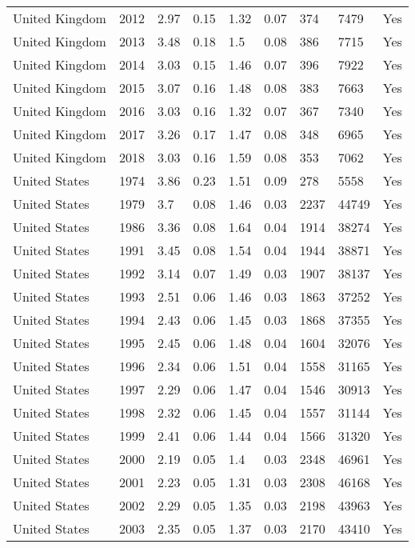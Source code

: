 \begin{tabular}{lllllllll}
United Kingdom & 2012 & 2.97 & 0.15 & 1.32 & 0.07 & 374 & 7479 & Yes \\ 
United Kingdom & 2013 & 3.48 & 0.18 & 1.5 & 0.08 & 386 & 7715 & Yes \\ 
United Kingdom & 2014 & 3.03 & 0.15 & 1.46 & 0.07 & 396 & 7922 & Yes \\ 
United Kingdom & 2015 & 3.07 & 0.16 & 1.48 & 0.08 & 383 & 7663 & Yes \\ 
United Kingdom & 2016 & 3.03 & 0.16 & 1.32 & 0.07 & 367 & 7340 & Yes \\ 
United Kingdom & 2017 & 3.26 & 0.17 & 1.47 & 0.08 & 348 & 6965 & Yes \\ 
United Kingdom & 2018 & 3.03 & 0.16 & 1.59 & 0.08 & 353 & 7062 & Yes \\ 
United States & 1974 & 3.86 & 0.23 & 1.51 & 0.09 & 278 & 5558 & Yes \\ 
United States & 1979 & 3.7 & 0.08 & 1.46 & 0.03 & 2237 & 44749 & Yes \\ 
United States & 1986 & 3.36 & 0.08 & 1.64 & 0.04 & 1914 & 38274 & Yes \\ 
United States & 1991 & 3.45 & 0.08 & 1.54 & 0.04 & 1944 & 38871 & Yes \\ 
United States & 1992 & 3.14 & 0.07 & 1.49 & 0.03 & 1907 & 38137 & Yes \\ 
United States & 1993 & 2.51 & 0.06 & 1.46 & 0.03 & 1863 & 37252 & Yes \\ 
United States & 1994 & 2.43 & 0.06 & 1.45 & 0.03 & 1868 & 37355 & Yes \\ 
United States & 1995 & 2.45 & 0.06 & 1.48 & 0.04 & 1604 & 32076 & Yes \\ 
United States & 1996 & 2.34 & 0.06 & 1.51 & 0.04 & 1558 & 31165 & Yes \\ 
United States & 1997 & 2.29 & 0.06 & 1.47 & 0.04 & 1546 & 30913 & Yes \\ 
United States & 1998 & 2.32 & 0.06 & 1.45 & 0.04 & 1557 & 31144 & Yes \\ 
United States & 1999 & 2.41 & 0.06 & 1.44 & 0.04 & 1566 & 31320 & Yes \\ 
United States & 2000 & 2.19 & 0.05 & 1.4 & 0.03 & 2348 & 46961 & Yes \\ 
United States & 2001 & 2.23 & 0.05 & 1.31 & 0.03 & 2308 & 46168 & Yes \\ 
United States & 2002 & 2.29 & 0.05 & 1.35 & 0.03 & 2198 & 43963 & Yes \\ 
United States & 2003 & 2.35 & 0.05 & 1.37 & 0.03 & 2170 & 43410 & Yes \\ 

\end{tabular}
